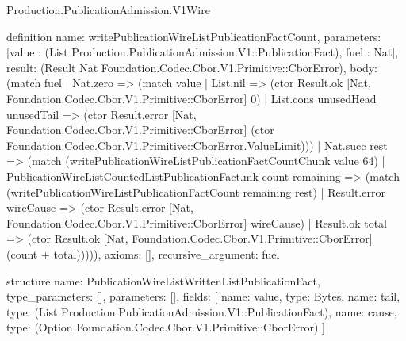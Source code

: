 \begin{lexlean}{Production.PublicationAdmission.V1Wire}
\begin{semanticmodule}
definition{
  name: writePublicationWireListPublicationFactCount,
  parameters: [value : (List Production.PublicationAdmission.V1::PublicationFact), fuel : Nat],
  result: (Result Nat Foundation.Codec.Cbor.V1.Primitive::CborError),
  body: (match fuel
    | Nat.zero => (match value
      | List.nil => (ctor Result.ok [Nat, Foundation.Codec.Cbor.V1.Primitive::CborError] 0)
      | List.cons unusedHead unusedTail => (ctor Result.error [Nat, Foundation.Codec.Cbor.V1.Primitive::CborError] (ctor Foundation.Codec.Cbor.V1.Primitive::CborError.ValueLimit)))
    | Nat.succ rest => (match (writePublicationWireListPublicationFactCountChunk value 64)
      | PublicationWireListCountedListPublicationFact.mk count remaining => (match (writePublicationWireListPublicationFactCount remaining rest)
        | Result.error wireCause => (ctor Result.error [Nat, Foundation.Codec.Cbor.V1.Primitive::CborError] wireCause)
        | Result.ok total => (ctor Result.ok [Nat, Foundation.Codec.Cbor.V1.Primitive::CborError] (count + total))))),
  axioms: [],
  recursive_argument: fuel
}

structure{
  name: PublicationWireListWrittenListPublicationFact,
  type_parameters: [],
  parameters: [],
  fields: [
    {name: value, type: Bytes},
    {name: tail, type: (List Production.PublicationAdmission.V1::PublicationFact)},
    {name: cause, type: (Option Foundation.Codec.Cbor.V1.Primitive::CborError)}
  ]
}


\end{semanticmodule}
\end{lexlean}
